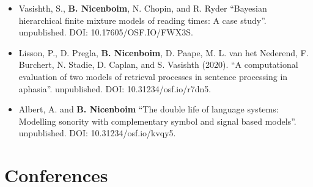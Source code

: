 \documentclass[]{article}
\begin{document}
\begin{itemize}
\item
  Vasishth, S., \textbf{B. Nicenboim}, N. Chopin, and R. Ryder
  ``Bayesian hierarchical finite mixture models of reading times: A case
  study''. unpublished. DOI: 10.17605/OSF.IO/FWX3S.
\item
  Lisson, P., D. Pregla, \textbf{B. Nicenboim}, D. Paape, M. L. van het
  Nederend, F. Burchert, N. Stadie, D. Caplan, and S. Vasishth (2020).
  ``A computational evaluation of two models of retrieval processes in
  sentence processing in aphasia''. unpublished. DOI:
  10.31234/osf.io/r7dn5.
\item
  Albert, A. and \textbf{B. Nicenboim} ``The double life of language
  systems: Modelling sonority with complementary symbol and signal based
  models''. unpublished. DOI: 10.31234/osf.io/kvqy5.
\end{itemize}

\hypertarget{conferences}{%
\section{Conferences}\label{conferences}}
\end{document}
